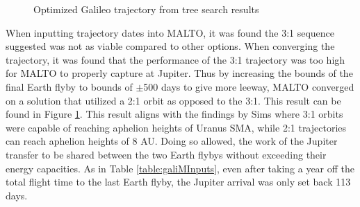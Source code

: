 \documentclass[letterpaper, preprint, paper,11pt]{AAS}	%
\newcommand*\circled[1]{\tikz[baseline=(char.base)]{
            \node[shape=circle,draw,inner sep=0.8pt] (char) {#1};}}
\begin{document}
\begin{figure}[htb]
    \centering
    \caption{Optimized Galileo trajectory from tree search results}
    \label{fig:galiMalto}
\end{figure}

When inputting trajectory dates into MALTO, it was found the 3:1 sequence suggested was not as viable compared to other options. When converging the trajectory, it was found that the performance of the 3:1 trajectory was too high for MALTO to properly capture at Jupiter. Thus by increasing the bounds of the final Earth flyby to bounds of $\pm$500 days to give more leeway, MALTO converged on a solution that utilized a 2:1 orbit as opposed to the 3:1. This result can be found in Figure \ref*{fig:galiMalto}. This result aligns with the findings by Sims \cite{sims1994} where 3:1 orbits were capable of reaching aphelion heights of Uranus SMA, while 2:1 trajectories can reach aphelion heights of 8 AU. Doing so allowed, the work of the Jupiter transfer to be shared between the two Earth flybys without exceeding their energy capacities. As in Table \ref*{table:galiMInputs}, even after taking a year off the total flight time to the last Earth flyby, the Jupiter arrival was only set back 113 days.
\end{document}

